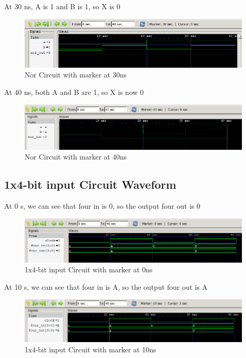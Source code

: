 \documentclass[12pt]{article}
\begin{document}
\newpage

At 30 ns, A is 1 and B is 1, so X is 0
\begin{figure}[h]
    \centering
    \includegraphics[width = 1.0\textwidth]{figs/Nor30.png}
    \caption{Nor Circuit with marker at 30ns}
    \label{fig:enter-label}
\end{figure}


At 40 ns, both A and B are 1, so X is now 0 
\begin{figure}[h]
    \centering
    \includegraphics[width = 1.0\textwidth]{figs/Nor40.png}
    \caption{Nor Circuit with marker at 40ns}
    \label{fig:enter-label}
\end{figure}




\subsection{1x4-bit input Circuit Waveform}

At 0 s, we can see that four in is 0, so the output four out is 0
\begin{figure}[h]
    \centering
    \includegraphics[width = 1.0\textwidth]{figs/Input0.png}
    \caption{1x4-bit input Circuit with marker at 0ns}
    \label{fig:enter-label}
\end{figure}

\newpage

At 10 s, we can see that four in is A, so the output four out is A
\begin{figure}[h]
    \centering
    \includegraphics[width = 1.0\textwidth]{figs/Input10.png}
    \caption{1x4-bit input Circuit with marker at 10ns}
    \label{fig:enter-label}
\end{figure}
\end{document}
